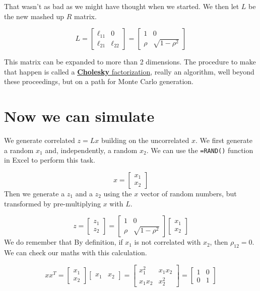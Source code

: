 \documentclass[
]{book}
\begin{document}
That wasn't as bad as we might have thought when we started. We then let \(L\) be the new mashed up \(R\) matrix.

\[
L =
\begin{bmatrix}
\ell_{11} & 0 \\
\ell_{21} & \ell_{22}
\end{bmatrix}
= 
\begin{bmatrix}
1 & 0 \\
\rho & \sqrt{1 - \rho^2}
\end{bmatrix}
\]

This matrix can be expanded to more than 2 dimensions. The procedure to make that happen is called a \href{https://en.wikipedia.org/wiki/Cholesky_decomposition}{\textbf{Cholesky} factorization}, really an algorithm, well beyond these proceedings, but on a path for Monte Carlo generation.

\hypertarget{now-we-can-simulate}{%
\section{Now we can simulate}\label{now-we-can-simulate}}

We generate correlated \(z = Lx\) building on the uncorrelated \(x\). We first generate a random \(x_1\) and, independently, a random \(x_2\). We can use the \texttt{=RAND()} function in Excel to perform this task.

\[
x =
\begin{bmatrix}
x_1 \\
x_2
\end{bmatrix}
\]
Then we generate a \(z_1\) and a \(z_2\) using the \(x\) vector of random numbers, but transformed by pre-multiplying \(x\) with \(L\).

\[
z = 
\begin{bmatrix}
z_1 \\
z_2
\end{bmatrix}
=
\begin{bmatrix}
1 & 0 \\
\rho & \sqrt{1 - \rho^2}
\end{bmatrix}
\begin{bmatrix}
x_1 \\
x_2
\end{bmatrix}
\]
We do remember that By definition, if \(x_1\) is not correlated with \(x_2\), then \(\rho_{12} = 0\). We can check our maths with this calculation.

\[
xx^T
=
\begin{bmatrix}
x_1 \\
x_2
\end{bmatrix}
\begin{bmatrix}
x_1 & x_2
\end{bmatrix}
=
\begin{bmatrix}
x_1^2 & x_1 x_2 \\
x_1 x_2 & x_2^2
\end{bmatrix}
=
\begin{bmatrix}
1 & 0 \\
0 & 1
\end{bmatrix}
\]
\end{document}
